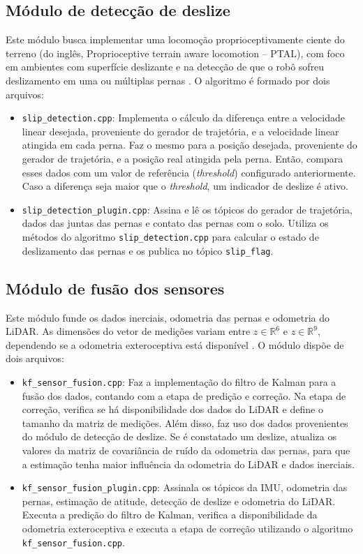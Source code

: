 \subsection{Módulo de detecção de deslize}
Este módulo busca implementar uma locomoção proprioceptivamente ciente do terreno (do inglês, Proprioceptive terrain aware locomotion -- PTAL), com foco em ambientes com superfície deslizante e na detecção de que o robô sofreu deslizamento em uma ou múltiplas pernas \cite{nistico2022slip}. O algoritmo é formado por dois arquivos:

\begin{itemize}
    \item \texttt{slip\_detection.cpp}: Implementa o cálculo da diferença entre a velocidade linear desejada, proveniente do gerador de trajetória, e a velocidade linear atingida em cada perna. Faz o mesmo para a posição desejada, proveniente do gerador de trajetória, e a posição real atingida pela perna. Então, compara esses dados com um valor de referência (\textit{threshold}) configurado anteriormente. Caso a diferença seja maior que o \textit{threshold}, um indicador de deslize é ativo.
    \item \texttt{slip\_detection\_plugin.cpp}: Assina e lê os tópicos do gerador de trajetória, dados das juntas das pernas e contato das pernas com o solo. Utiliza os métodos do algoritmo \texttt{slip\_detection.cpp} para calcular o estado de deslizamento das pernas e os publica no tópico \texttt{slip\_flag}.
\end{itemize}

\subsection{Módulo de fusão dos sensores}
Este módulo funde os dados inerciais, odometria das pernas e odometria do LiDAR. As dimensões do vetor de medições variam entre $z \in \mathbb{R}^6$ e $z \in \mathbb{R}^9$, dependendo se a odometria exteroceptiva está disponível \cite{nistico2025muse}. O módulo dispõe de dois arquivos:
\begin{itemize}
    \item \texttt{kf\_sensor\_fusion.cpp}: Faz a implementação do filtro de Kalman para a fusão dos dados, contando com a etapa de predição e correção. Na etapa de correção, verifica se há disponibilidade dos dados do LiDAR e define o tamanho da matriz de medições. Além disso, faz uso dos dados provenientes do módulo de detecção de deslize. Se é constatado um deslize, atualiza os valores da matriz de covariância de ruído da odometria das pernas, para que a estimação tenha maior influência da odometria do LiDAR e dados inerciais.
    \item \texttt{kf\_sensor\_fusion\_plugin.cpp}: Assinala os tópicos da IMU, odometria das pernas, estimação de atitude, detecção de deslize e odometria do LiDAR. Executa a predição do filtro de Kalman, verifica a disponibilidade da odometria exteroceptiva e executa a etapa de correção utilizando o algoritmo \texttt{kf\_sensor\_fusion.cpp}.
\end{itemize}

